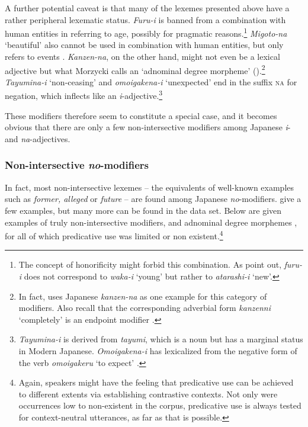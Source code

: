 \documentclass [output=book,colorlinks,citecolor=brown]{langscibook}
\begin{document}
A further potential caveat is that many of the lexemes presented above have a rather peripheral lexematic status. \textit{Furu-i} is banned from a combination with human entities in referring to age, possibly for pragmatic reasons.\footnote{The concept of honorificity might forbid this combination. As \citet[123]{nagano:2015:RA} point out, \textit{furu-i} does not correspond to \textit{waka-i} `young' but rather to \textit{atarashi-i} `new'.} \textit{Migoto-na} `beautiful' also cannot be used in combination with human entities, but only refers to events \citep[786]{watanabe:2017:attributive}. \textit{Kanzen-na}, on the other hand, might not even be a lexical adjective but what Morzycki calls an `adnominal degree morpheme' (\citeyear{morzycki:2009:degree, morzycki:2012:adj, morzycki:2012:faces}).\footnote{In fact, \citet{morzycki:2014:where} uses Japanese \textit{kanzen-na} as one example for this category of modifiers. Also recall that the corresponding adverbial form \textit{kanzenni} `completely' is an endpoint modifier \citep{oshima:2019:gradability}.} \textit{Tayumina-i} `non-ceasing' and \textit{omoigakena-i} `unexpected' end in the suffix \textsc{na} for negation, which inflects like an \textit{i}-adjective.\footnote{\textit{Tayumina-i} is derived from \textit{tayumi}, which is a noun but has a marginal status in Modern Japanese. \textit{Omoigakena-i} has lexicalized from the negative form of the verb \textit{omoigakeru} `to expect’ \citep[803]{watanabe:2017:attributive}.}

These modifiers therefore seem to constitute a special case, and it becomes obvious that there are only a few non-intersective modifiers among Japanese \textit{i}- and \textit{na}-adjectives.

\subsubsection{Non-intersective \textit{no}-modifiers}

In fact, most non-intersective lexemes -- the equivalents of well-known examples such as \textit{former, alleged} or \textit{future} -- are found among Japanese \textit{no}-modifiers. \citet[122]{nagano:2015:RA} give a few examples, but many more can be found in the data set. Below are given examples of truly non-intersective modifiers, and adnominal degree morphemes \citep{morzycki:2014:where}, for all of which predicative use was limited or non existent.\footnote{Again, speakers might have the feeling that predicative use can be achieved to different extents via establishing contrastive contexts. Not only were occurrences low to non-existent in the corpus, predicative use is always tested for context-neutral utterances, as far as that is possible.} %
\end{document}
